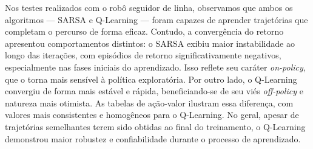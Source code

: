 \documentclass[a4paper,12pt]{article}
\begin{document}
Nos testes realizados com o robô seguidor de linha, observamos que ambos os algoritmos — SARSA e Q-Learning — foram capazes de aprender trajetórias que completam o percurso de forma eficaz. Contudo, a convergência do retorno apresentou comportamentos distintos: o SARSA exibiu maior instabilidade ao longo das iterações, com episódios de retorno significativamente negativos, especialmente nas fases iniciais do aprendizado. Isso reflete seu caráter \textit{on-policy}, que o torna mais sensível à política exploratória. Por outro lado, o Q-Learning convergiu de forma mais estável e rápida, beneficiando-se de seu viés \textit{off-policy} e natureza mais otimista. As tabelas de ação-valor ilustram essa diferença, com valores mais consistentes e homogêneos para o Q-Learning. No geral, apesar de trajetórias semelhantes terem sido obtidas ao final do treinamento, o Q-Learning demonstrou maior robustez e confiabilidade durante o processo de aprendizado.
\end{document}
